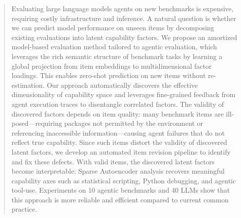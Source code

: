 \documentclass{article}
\theoremstyle{plain}
\theoremstyle{definition}
\theoremstyle{remark}
\begin{document}
\printAffiliationsAndNotice{}  %

\begin{abstract}
Evaluating large language models agents on new benchmarks is expensive, requiring costly infrastructure and inference. A natural question is whether we can predict model performance on unseen items by decomposing existing evaluations into latent capability factors. We propose an amortized model-based evaluation method tailored to agentic evaluation, which leverages the rich semantic structure of benchmark tasks by learning a global projection from item embeddings to multidimensional factor loadings. This enables zero-shot prediction on new items without re-estimation. Our approach automatically discovers the effective dimensionality of capability space and leverages fine-grained feedback from agent execution traces to disentangle correlated factors. The validity of discovered factors depends on item quality: many benchmark items are ill-posed---requiring packages not permitted by the environment or referencing inaccessible information---causing agent failures that do not reflect true capability. Since such items distort the validity of discovered latent factors, we develop an automated item revision pipeline to identify and fix these defects. With valid items, the discovered latent factors become interpretable: Sparse Autoencoder analysis recovers meaningful capability axes such as statistical scripting, Python debugging, and agentic tool-use. Experiments on 10 agentic benchmarks and 40 LLMs show that this approach is more reliable and efficient compared to current common practice.
\end{abstract}



\end{document}
